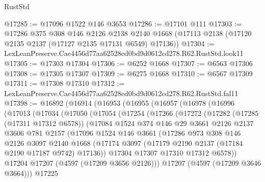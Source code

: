 \begin{lexlean}{RustStd}
\begin{coremodule}
@17285 := @17096 @1522 @146 @3653
@17286 := @17101 @111
@17303 := @17286
    @375
    @308
    @146
    @2126
    @2138
    @2140
    @1668
    (@17113 @2138 (@17120 @2135 @2137 (@17127 @2135 @17131 @6549) @17136))
@17304 := LexLeanPreserve.Cae4456d77aa62528ed0bd9d0612cd278.R62.RustStd.look11
@17305 := @17303 @17304
@17306 := @6252 @1668
@17307 := @6563 @17306
@17308 := @17305 @17307
@17309 := @6275 @1668
@17310 := @6567 @17309
@17311 := @17308 @17310
@17312 := LexLeanPreserve.Cae4456d77aa62528ed0bd9d0612cd278.R62.RustStd.fal11
@17398 := @16892
    (@16914
      (@16953
        (@16955
          (@16957
            (@16978
              (@16996
                (@17013
                  (@17034
                    (@17050
                      (@17054
                        (@17254
                          (@17266
                            (@17272
                              (@17282
                                (@17285 (@17311 @17312 @6578))
                                (@17084
                                  @1524
                                  @374
                                  @146
                                  @29
                                  @3661
                                  @2126
                                  @2137
                                  @3606
                                  @781
                                  @2157
                                  (@17096
                                    @1524
                                    @146
                                    @3661
                                    (@17286
                                      @973
                                      @308
                                      @146
                                      @2126
                                      @3097
                                      @2140
                                      @1668
                                      (@17174
                                        @3097
                                        (@17179 @2190 @2137 (@17184 @2190 @17187 @9742) @17136))
                                      @17304
                                      @17307
                                      @17310
                                      @17312
                                      @6578))
                                  @17204
                                  @17207
                                  (@4597 (@17209 @3656 @2126)))
                                @17207
                                (@4597 (@17209 @3646 @3664)))
                              @17225

\end{coremodule}
\end{lexlean}
